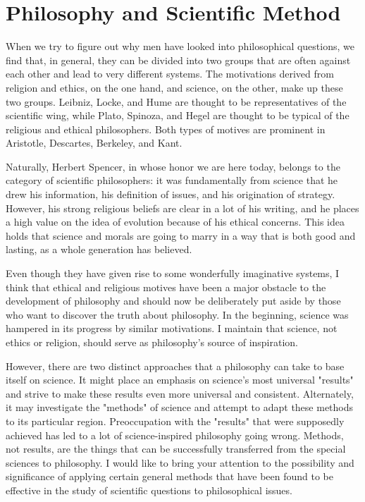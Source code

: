 \documentclass[a4paper,12pt]{book}[2004/02/16]
\theoremstyle{ilemma}
\theoremstyle{itheorem}
\theoremstyle{iother}
\theoremstyle{icorollary}
\theoremstyle{numcorollary}
\theoremstyle{idefinition}
\begin{document}
\chapter{Philosophy and Scientific Method}
When we try to figure out why men have looked into philosophical questions, we find that, in general, they can be divided into two groups that are often against each other and lead to very different systems. The motivations derived from religion and ethics, on the one hand, and science, on the other, make up these two groups. Leibniz, Locke, and Hume are thought to be representatives of the scientific wing, while Plato, Spinoza, and Hegel are thought to be typical of the religious and ethical philosophers. Both types of motives are prominent in Aristotle, Descartes, Berkeley, and Kant.

Naturally, Herbert Spencer, in whose honor we are here today, belongs to the category of scientific philosophers: it was fundamentally from
science that he drew his information, his definition of issues, and his
origination of strategy. However, his strong religious beliefs are clear in a lot of his writing, and he places a high value on the idea of evolution because of his ethical concerns. This idea holds that science and morals are going to marry in a way that is both good and lasting, as a whole generation has believed.

Even though they have given rise to some wonderfully imaginative systems, I think that ethical and religious motives have been a major obstacle to the development of philosophy and should now be deliberately put aside by those who want to discover the truth about philosophy. In the beginning, science was hampered in its progress by similar motivations. I maintain that science, not ethics or religion, should serve as philosophy's source of inspiration.

However, there are two distinct approaches that a philosophy can take to base itself on science. It might place an emphasis on science's most universal "results" and strive to make these results even more universal and consistent. Alternately, it may investigate the "methods" of science and attempt to adapt these methods to its particular region. Preoccupation with the "results" that were supposedly achieved has led to a lot of science-inspired philosophy going wrong. Methods, not results, are the things that can be successfully transferred from the special sciences to philosophy. I would like to bring your attention to the possibility and significance of applying certain general methods that have been found to be effective in the study of scientific questions to philosophical issues.
\end{document}
